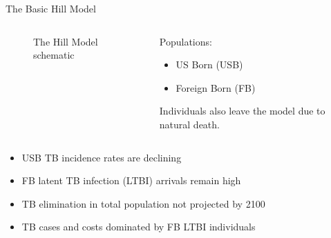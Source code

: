 \documentclass[final]{beamer}
\begin{document}
\begin{frame}
\begin{columns}[T]
\begin{column}{.3\textwidth}
\begin{block}{The Basic Hill Model}
\begin{columns}[T]
\begin{column}{.5\textwidth}
\begin{figure}[h]
\begin{center}
              \end{center}
              \caption{The Hill Model schematic}
              \label{fig:hillFlow}
            \end{figure}
          \end{column}
          \begin{column}{.45\textwidth}
              \vspace{1.5em}
            Populations:
            \begin{itemize}
              \item US Born (USB) 
              \item Foreign Born (FB)
            \end{itemize}
            Individuals also leave the model due to natural death.
          \end{column}
        \end{columns}
        \vspace{0.6em}
        \begin{itemize}
          \item USB TB incidence rates are declining
          \item FB latent TB infection (LTBI) arrivals remain high
          \item TB elimination in total population not projected by 2100
          \item TB cases and costs dominated by FB LTBI individuals
        \end{itemize}
        \vspace{0.6em}
        \begin{columns}[T]
          \begin{column}{.47\textwidth}
            \begin{figure}[h]
              \begin{center}

\end{center}
\end{figure}
\end{column}
\end{columns}
\end{block}
\end{column}
\end{columns}
\end{frame}
\end{document}
